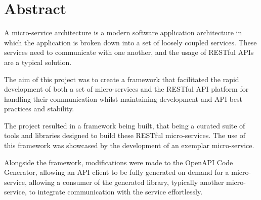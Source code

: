 
\chapter*{Abstract}

A micro-service architecture is a modern software application architecture in which the application is broken down into a set of loosely coupled services. These services need to communicate with one another, and the usage of RESTful APIs are a typical solution.

The aim of this project was to create a framework that facilitated the rapid development of both a set of micro-services and the RESTful API platform for handling their communication whilst maintaining development and API best practices and stability.

The project resulted in a framework being built, that being a curated suite of tools and libraries designed to build these RESTful micro-services. The use of this framework was showcased by the development of an exemplar micro-service.

Alongside the framework, modifications were made to the OpenAPI Code Generator, allowing an API client to be fully generated on demand for a micro-service, allowing a consumer of the generated library, typically another micro-service, to integrate communication with the service effortlessly.

